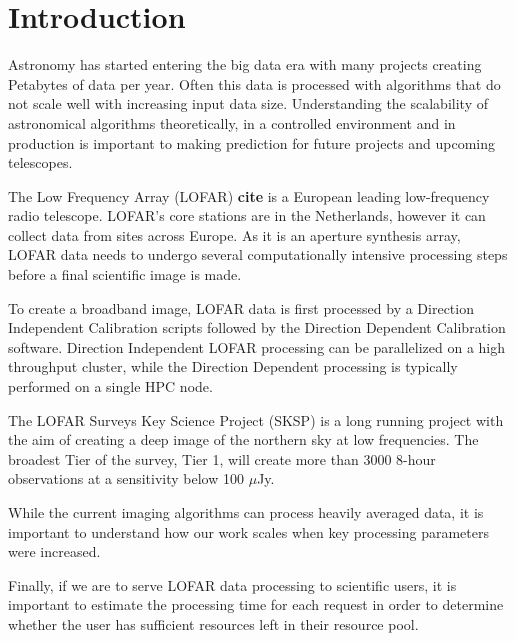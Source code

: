 \documentclass[preprint,5p]{elsarticle}
\begin{document}
\section{\label{sec:intro}Introduction }

Astronomy has started entering the big data era with many projects creating Petabytes of data per year. Often this data is processed with algorithms that do not scale well with increasing input data size. Understanding the scalability of astronomical algorithms theoretically, in a controlled environment and in production is important to making prediction for future projects and upcoming telescopes. 

The Low Frequency Array (LOFAR) \textbf{cite} is a European leading low-frequency radio telescope. LOFAR's core stations are in the Netherlands, however it can collect data from sites across Europe. As it is an aperture synthesis array, LOFAR data needs to undergo several computationally intensive processing steps before a final scientific image is made. 

To create a broadband image, LOFAR data is first processed by a Direction Independent Calibration scripts followed by the Direction Dependent Calibration software. Direction Independent LOFAR processing can be parallelized on a high throughput cluster, while the Direction Dependent processing is typically performed on a single HPC node. 

The LOFAR Surveys Key Science Project (SKSP) is a long running project with the aim of creating a deep image of the northern sky at low frequencies. The broadest Tier of the survey, Tier 1, will create more than 3000 8-hour observations at a sensitivity below 100 $\mu$Jy. 

While the current imaging algorithms can process heavily averaged data, it is important to understand how our work scales when key processing parameters were increased. 

Finally, if we are to serve LOFAR data processing to scientific users, it is important to estimate the processing time for each request in order to determine whether the user has sufficient resources left in their resource pool. 

\end{document}
